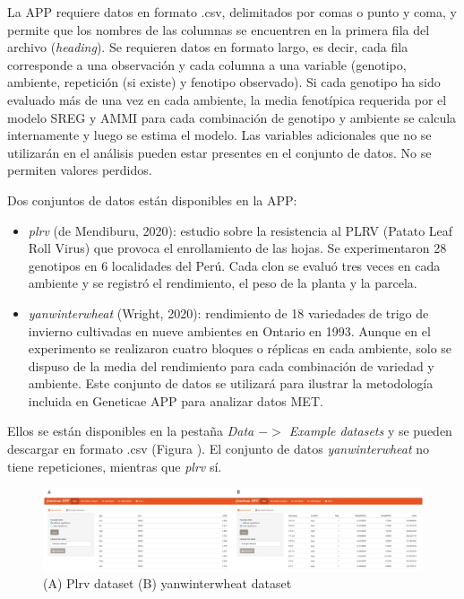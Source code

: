La APP requiere datos en formato .csv, delimitados por comas o punto y coma, y permite que los nombres de las columnas se encuentren en la primera fila del archivo (\emph{heading}). Se requieren datos en formato largo, es decir, cada fila corresponde a una observación y cada columna a una variable (genotipo, ambiente, repetición (si existe) y fenotipo observado). Si cada genotipo ha sido evaluado más de una vez en cada ambiente, la media fenotípica requerida por el modelo SREG y AMMI para cada combinación de genotipo y ambiente se calcula internamente y luego se estima el modelo. Las variables adicionales que no se utilizarán en el análisis pueden estar presentes en el conjunto de datos. No se permiten valores perdidos.

Dos conjuntos de datos están disponibles en la APP:

\begin{itemize}
\item \emph{plrv} (de Mendiburu, 2020): estudio sobre la resistencia al PLRV (Patato Leaf Roll Virus) que provoca el enrollamiento de las hojas. Se experimentaron 28 genotipos en 6 localidades del Perú. Cada clon se evaluó tres veces en cada ambiente y se registró el rendimiento, el peso de la planta y la parcela.
\item \emph{yanwinterwheat} (Wright, 2020): rendimiento de 18 variedades de trigo de invierno cultivadas en nueve ambientes en Ontario en 1993. Aunque en el experimento se realizaron cuatro bloques o réplicas en cada ambiente, solo se dispuso de la media del rendimiento para cada combinación de variedad y ambiente. Este conjunto de datos se utilizará para ilustrar la metodología incluida en Geneticae APP para analizar datos MET.
\end{itemize}


Ellos se están disponibles en la pestaña \emph{Data $->$ Example datasets} y se pueden descargar en formato .csv (Figura ). El conjunto de datos \emph{yanwinterwheat} no tiene repeticiones, mientras que \emph{plrv} sí. 

 \begin{figure}[H]
	\begin{center}
		\includegraphics[width=16cm]{./Graficos/www/exampledata.jpg}
	\end{center}
	\caption{(A) Plrv dataset (B) yanwinterwheat dataset }
	\label{fig:fig431}
\end{figure}



